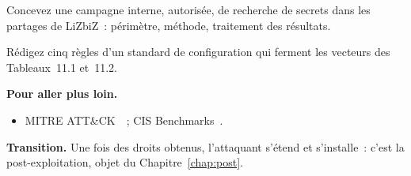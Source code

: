 \begin{boxexo}[title={\ding{45}\quad Exercice~11.9. Recherche de secrets \niveauexpert}]
Concevez une campagne interne, autorisée, de recherche de secrets dans les
partages de LiZbiZ~: périmètre, méthode, traitement des résultats.
\end{boxexo}

\begin{boxexo}[title={\ding{45}\quad Exercice~11.10. Standard \niveauexpert}]
Rédigez cinq règles d'un standard de configuration qui ferment les vecteurs
des Tableaux~11.1 et~11.2.
\end{boxexo}

\bigskip

\begin{boxinfo}
\textbf{Pour aller plus loin.}
\begin{itemize}
    \item MITRE ATT\&CK~\cite{mitreattack}~; CIS Benchmarks~\cite{cis2021controls}.
\end{itemize}
\end{boxinfo}

\begin{boxinfo}
\textbf{Transition.} Une fois des droits obtenus, l'attaquant s'étend et
s'installe~: c'est la post-exploitation, objet du Chapitre~\ref{chap:post}.
\end{boxinfo}
